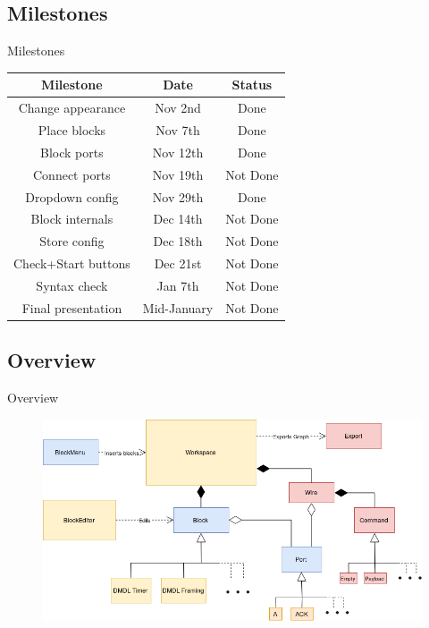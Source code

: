 \documentclass{beamer}
\begin{document}
\subsection{Milestones}
\begin{frame}{Milestones}
\centering
	\begin{tabular}{|c|c|c|} \hline
		\textbf{Milestone} & \textbf{Date} & \textbf{Status} \\ \hline
		Change appearance & Nov 2nd & Done \\ \hline
		Place blocks & Nov 7th & Done \\ \hline
		Block ports & Nov 12th & Done \\ \hline
		Connect ports & Nov 19th & Not Done \\ \hline
		Dropdown config & Nov 29th & Done \\ \hline
		Block internals & Dec 14th & Not Done \\ \hline
		Store config & Dec 18th & Not Done \\ \hline
		Check+Start buttons & Dec 21st & Not Done \\ \hline
		Syntax check & Jan 7th & Not Done \\ \hline
		Final presentation & Mid-January & Not Done \\ \hline
	\end{tabular}
\end{frame}


\subsection{Overview}
\begin{frame}{Overview}
\centering
	\begin{figure}
 		\includegraphics[width=\linewidth]{dmdl-editor-status.png}
 		\label{fig:uml-status}
	\end{figure}
\end{frame}
\end{document}
